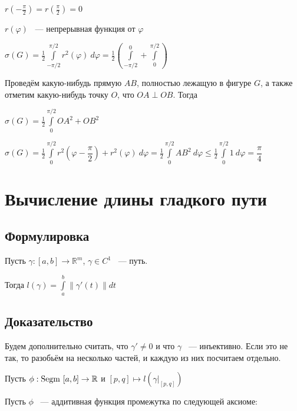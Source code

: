 \documentclass{article}
\begin{document}
            $r(-\frac{\pi}{2}) = r(\frac{\pi}{2}) = 0$
            
            $r(\varphi)$ ~--- непрерывная функция от $\varphi$
            
            $\sigma(G) = \frac{1}{2} \int\limits^{\pi / 2}_{-\pi / 2} r^2 (\varphi) \ d \varphi = \frac{1}{2} \left( \int\limits^0_{-\pi / 2} + \int\limits^{\pi / 2}_0 \right)$
            
            Проведём какую-нибудь прямую $AB$, полностью лежащую в фигуре $G$, а также отметим какую-нибудь точку $O$, что $OA \perp OB$. Тогда
            
            $\sigma(G) = \frac{1}{2} \int\limits^{\pi / 2}_0 OA^2 + OB^2$
            
            $\sigma(G) = \frac{1}{2} \int\limits^{\pi / 2}_0 r^2 (\varphi - \dfrac{\pi}{2}) + r^2 (\varphi) \ d \varphi = \frac{1}{2} \int\limits^{\pi / 2}_0 AB^2 \ d \varphi \leq \frac{1}{2} \int\limits^{\pi / 2}_0 1 \ d \varphi = \dfrac{\pi}{4}$
            
    \newpage
    
    \section{Вычисление длины гладкого пути}
    
        \subsection{Формулировка}
        
            Пусть $\gamma : [a, b] \rightarrow \mathbb{R}^m$, $\gamma \in C^1$ ~--- путь.
            
            Тогда $l(\gamma) = \int\limits^b_a \| \gamma'(t) \| dt$
            
        \subsection{Доказательство}
        
            Будем дополнительно считать, что $\gamma' \neq 0$ и что $\gamma$ ~--- инъективно. Если это не так, то разобьём на несколько частей, и каждую из них посчитаем отдельно.
            
            Пусть $\phi : \Segm[a, b] \rightarrow \mathbb{R}$ и $[p, q] \mapsto l\left(\gamma|_{[p, q]} \right)$
            
            Пусть $\phi$ ~--- аддитивная функция промежутка по следующей аксиоме:
            
\end{document}
